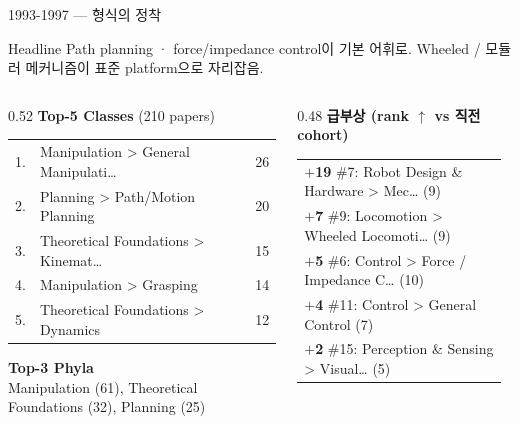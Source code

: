 \documentclass[aspectratio=169,t]{beamer}
\newcommand{\hot}[1]{\textcolor{accentorange}{\textbf{#1}}}
\newcommand{\muted}[1]{\textcolor{mutedgray}{#1}}
\begin{document}
\begin{frame}{1993-1997 \quad — \quad 형식의 정착}
\small
\begin{block}{Headline}
Path planning · force/impedance control이 기본 어휘로. Wheeled / 모듈러 메커니즘이 표준 platform으로 자리잡음.
\end{block}
\vspace{4pt}

\begin{columns}[T,onlytextwidth]
\begin{column}{0.52\textwidth}
\textbf{Top-5 Classes} \muted{\scriptsize (210 papers)}\\[2pt]
\scriptsize
\begin{tabular}{@{}rlr@{}}
    1. & Manipulation > General Manipulati… & 26 \\
    2. & Planning > Path/Motion Planning & 20 \\
    3. & Theoretical Foundations > Kinemat… & 15 \\
    4. & Manipulation > Grasping & 14 \\
    5. & Theoretical Foundations > Dynamics & 12 \\
\end{tabular}
\vspace{8pt}

\textbf{\small Top-3 Phyla}\\[2pt]
\scriptsize Manipulation (61), Theoretical Foundations (32), Planning (25)
\end{column}

\begin{column}{0.48\textwidth}
\textbf{급부상 (rank $\uparrow$ vs 직전 cohort)}\\[2pt]
\scriptsize
\begin{tabular}{@{}p{0.95\linewidth}@{}}
    \hot{$+$19} \#7: Robot Design \& Hardware > Mec… (9) \\
    \hot{$+$7} \#9: Locomotion > Wheeled Locomoti… (9) \\
    \hot{$+$5} \#6: Control > Force / Impedance C… (10) \\
    \hot{$+$4} \#11: Control > General Control (7) \\
    \hot{$+$2} \#15: Perception \& Sensing > Visual… (5) \\
\end{tabular}
\end{column}
\end{columns}
\end{frame}
\end{document}
